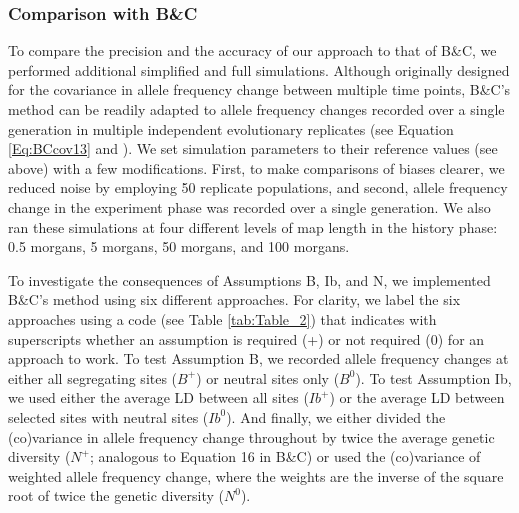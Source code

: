 \documentclass[12pt]{article}
\begin{document}
\begin{bibunit}
\subsubsection*{Comparison with B\&C}

To compare the precision and the accuracy of our approach to that of B\&C, we performed additional simplified and full simulations. Although originally designed for the covariance in allele frequency change between multiple time points, B\&C's method can be readily adapted to allele frequency changes recorded over a single generation in multiple independent evolutionary replicates (see Equation \ref{Eq:BCcov13} and \citet{Buffalo.2020}). We set simulation parameters to their reference values (see above) with a few modifications. First, to make comparisons of biases clearer, we reduced noise by employing 50 replicate populations, and second, allele frequency change in the experiment phase was recorded over a single generation. We also ran these simulations at four different levels of map length in the history phase: 0.5 morgans, 5 morgans, 50 morgans, and 100 morgans.

To investigate the consequences of Assumptions B, Ib, and N, we implemented B\&C's method using six different approaches. For clarity, we label the six approaches using a code (see Table \ref{tab:Table_2}) that indicates with superscripts whether an assumption is required (+) or not required (0) for an approach to work. To test Assumption B, we recorded allele frequency changes at either all segregating sites ($B^+$) or neutral sites only ($B^0$). To test Assumption Ib, we used either the average LD between all sites ($Ib^+$) or the average LD between selected sites with neutral sites ($Ib^0$). And finally, we either divided the (co)variance in allele frequency change throughout by twice the average genetic diversity ($N^+$; analogous to Equation 16 in B\&C) or used the (co)variance of weighted allele frequency change, where the weights are the inverse of the square root of twice the genetic diversity ($N^0$).  


\end{bibunit}
\end{document}
